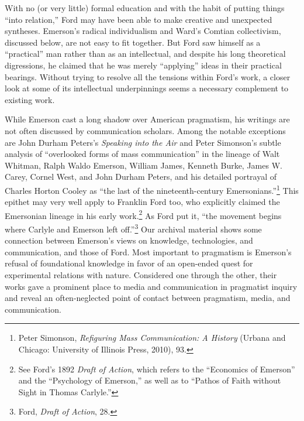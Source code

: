 \documentclass[twoside,symmetric,nobib,justified]{tufte-book}
\begin{document}
With no (or very little) formal education and with the habit of putting
things ``into relation,'' Ford may have been able to make creative and
unexpected syntheses. Emerson's radical individualism and Ward's Comtian
collectivism, discussed below, are not easy to fit together. But Ford
saw himself as a ``practical'' man rather than as an intellectual, and
despite his long theoretical digressions, he claimed that he was merely
``applying'' ideas in their practical bearings. Without trying to
resolve all the tensions within Ford's work, a closer look at some of
its intellectual underpinnings seems a necessary complement to existing
work.

While Emerson cast a long shadow over American pragmatism, his writings
are not often discussed by communication scholars. Among the notable
exceptions are John Durham Peters's \emph{Speaking into the Air} and
Peter Simonson's subtle analysis of ``overlooked forms of mass
communication'' in the lineage of Walt Whitman, Ralph Waldo Emerson,
William James, Kenneth Burke, James W. Carey, Cornel West, and John
Durham Peters, and his detailed portrayal of Charles Horton Cooley as
``the last of the nineteenth-century Emersonians.''\footnote{Peter
  Simonson, \emph{Refiguring Mass Communication: A History} (Urbana and
  Chicago: University of Illinois Press, 2010), 93.} This epithet may
very well apply to Franklin Ford too, who explicitly claimed the
Emersonian lineage in his early work.\footnote{See Ford's 1892
  \emph{Draft of Action}, which refers to the ``Economics of Emerson''
  and the ``Psychology of Emerson,'' as well as to ``Pathos of Faith
  without Sight in Thomas Carlyle.''} As Ford put it, ``the movement
begins where Carlyle and Emerson left off.''\footnote{Ford, \emph{Draft
  of Action}, 28.} Our archival material shows some connection between
Emerson's views on knowledge, technologies, and communication, and those
of Ford. Most important to pragmatism is Emerson's refusal of
foundational knowledge in favor of an open-ended quest for experimental
relations with nature. Considered one through the other, their works
gave a prominent place to media and communication in pragmatist inquiry
and reveal an often-neglected point of contact between pragmatism,
media, and communication.

\enlargethispage{\baselineskip}
\end{document}
